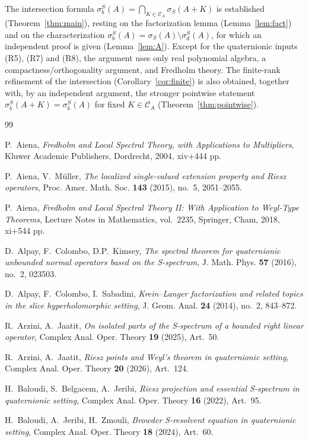 \documentclass[11pt,a4paper]{article}
\theoremstyle{plain}
\theoremstyle{remark}
\newcommand{\CA}{\mathcal C_A}
\newcommand{\sS}{\sigma_S}
\newcommand{\sigb}{\sigma_b^S}
\newcommand{\sd}{\sigma_d^S}
\begin{document}
The intersection formula $\sigb(A)=\bigcap_{K\in\CA}\sS(A+K)$ is established (Theorem~\ref{thm:main}), resting on the factorization lemma (Lemma~\ref{lem:fact}) and on the characterization $\sigb(A)=\sS(A)\setminus\sd(A)$, for which an independent proof is given (Lemma~\ref{lem:A}). Except for the quaternionic inputs (R5), (R7) and (R8), the argument uses only real polynomial algebra, a compactness/orthogonality argument, and Fredholm theory. The finite-rank refinement of the intersection (Corollary~\ref{cor:finite}) is also obtained, together with, by an independent argument, the stronger pointwise statement $\sigb(A+K)=\sigb(A)$ for fixed $K\in\CA$ (Theorem~\ref{thm:pointwise}).
\begin{thebibliography}{99}

 P.~Aiena, \emph{Fredholm and Local Spectral Theory, with Applications to Multipliers}, Kluwer Academic Publishers, Dordrecht, 2004, xiv+444 pp.

 P.~Aiena, V.~M\"uller, \emph{The localized single-valued extension property and Riesz operators}, Proc. Amer. Math. Soc. \textbf{143} (2015), no.~5, 2051--2055.

 P.~Aiena, \emph{Fredholm and Local Spectral Theory II: With Application to Weyl-Type Theorems}, Lecture Notes in Mathematics, vol.~2235, Springer, Cham, 2018, xi+544 pp.

 D.~Alpay, F.~Colombo, D.P.~Kimsey, \emph{The spectral theorem for quaternionic unbounded normal operators based on the S-spectrum}, J. Math. Phys. \textbf{57} (2016), no.~2, 023503.

 D.~Alpay, F.~Colombo, I.~Sabadini, \emph{Krein--Langer factorization and related topics in the slice hyperholomorphic setting}, J. Geom. Anal. \textbf{24} (2014), no.~2, 843--872.

 R.~Arzini, A.~Jaatit, \emph{On isolated parts of the S-spectrum of a bounded right linear operator}, Complex Anal. Oper. Theory \textbf{19} (2025), Art.~50.

 R.~Arzini, A.~Jaatit, \emph{Riesz points and Weyl's theorem in quaternionic setting}, Complex Anal. Oper. Theory \textbf{20} (2026), Art.~124.

 H.~Baloudi, S.~Belgacem, A.~Jeribi, \emph{Riesz projection and essential S-spectrum in quaternionic setting}, Complex Anal. Oper. Theory \textbf{16} (2022), Art.~95.

 H.~Baloudi, A.~Jeribi, H.~Zmouli, \emph{Browder S-resolvent equation in quaternionic setting}, Complex Anal. Oper. Theory \textbf{18} (2024), Art.~60.


\end{thebibliography}
\end{document}
